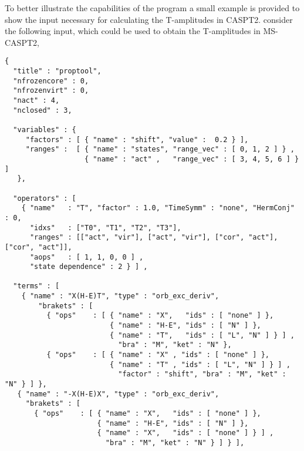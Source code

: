 To better illustrate the capabilities of the program a small example is
provided to show the input necessary for calculating the T-amplitudes
in CASPT2. 
consider the following input, which could be used to 
obtain the T-amplitudes in MS-CASPT2, 
\begin{lstlisting}[label={lst:input}]
{
  "title" : "proptool",
  "nfrozencore" : 0,
  "nfrozenvirt" : 0,
  "nact" : 4,
  "nclosed" : 3,

  "variables" : {
     "factors" : [ { "name" : "shift", "value" :  0.2 } ],
     "ranges" :  [ { "name" : "states", "range_vec" : [ 0, 1, 2 ] } ,
                   { "name" : "act" ,   "range_vec" : [ 3, 4, 5, 6 ] } ]
   },

  "operators" : [
    { "name"   : "T", "factor" : 1.0, "TimeSymm" : "none", "HermConj" : 0,
      "idxs"   : ["T0", "T1", "T2", "T3"],
      "ranges" : [["act", "vir"], ["act", "vir"], ["cor", "act"], ["cor", "act"]],
      "aops"   : [ 1, 1, 0, 0 ] ,
      "state dependence" : 2 } ] ,

  "terms" : [
    { "name" : "X(H-E)T", "type" : "orb_exc_deriv",
        "brakets" : [
          { "ops"    : [ { "name" : "X",   "ids" : [ "none" ] },
                         { "name" : "H-E", "ids" : [ "N" ] },
                         { "name" : "T",   "ids" : [ "L", "N" ] } ] ,
                           "bra" : "M", "ket" : "N" }, 
          { "ops"    : [ { "name" : "X" , "ids" : [ "none" ] },
                         { "name" : "T" , "ids" : [ "L", "N" ] } ] ,
                           "factor" : "shift", "bra" : "M", "ket" : "N" } ] },
   { "name" : "-X(H-E)X", "type" : "orb_exc_deriv",
     "brakets" : [
       { "ops"    : [ { "name" : "X",   "ids" : [ "none" ] },
                      { "name" : "H-E", "ids" : [ "N" ] },
                      { "name" : "X",   "ids" : [ "none" ] } ] ,
                        "bra" : "M", "ket" : "N" } ] } ],


\end{lstlisting}
